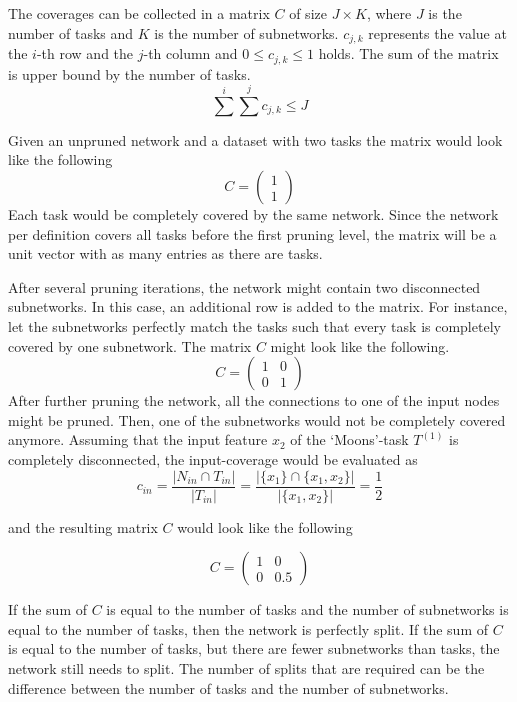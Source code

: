 The coverages can be collected in a matrix $C$ of size $J \times K$, where $J$ is the number of tasks and $K$ is the number of subnetworks. 
$c_{j,k}$ represents the value at the $i$-th row and the $j$-th column and $0 \leq c_{j,k} \leq 1$ holds.
The sum of the matrix is upper bound by the number of tasks.
\[
\sum^{i} \sum^{j} c_{j,k} \leq J
\]

Given an unpruned network and a dataset with two tasks the matrix would look like the following 
\[
C = \begin{pmatrix}
    1 \\ 1
\end{pmatrix}
\]
Each task would be completely covered by the same network.
Since the network per definition covers all tasks before the first pruning level, the matrix will be a unit vector with as many entries as there are tasks.

After several pruning iterations, the network might contain two disconnected subnetworks.
In this case, an additional row is added to the matrix.
For instance, let the subnetworks perfectly match the tasks such that every task is completely covered by one subnetwork.
The matrix $C$ might look like the following.
\[
C = \begin{pmatrix}
    1 & 0 \\ 0 & 1
\end{pmatrix}
\]
After further pruning the network, all the connections to one of the input nodes might be pruned.
Then, one of the subnetworks would not be completely covered anymore.
Assuming that the input feature $x_2$ of the `Moons'-task $T^{(1)}$ is completely disconnected, the input-coverage would be evaluated as 
\[
    c_{in} = \frac{|N_{in}  \cap T_{in} |}{|T_{in} |} = \frac{|\{x_1\} \cap \{x_1, x_2\}|}{|\{x_1, x_2\}|} = \frac{1}{2}
\]

and the resulting matrix $C$ would look like the following

\[
C = \begin{pmatrix}
    1 & 0 \\ 0 & 0.5
\end{pmatrix}
\]

If the sum of $C$ is equal to the number of tasks and the number of subnetworks is equal to the number of tasks, then the network is perfectly split.
If the sum of $C$ is equal to the number of tasks, but there are fewer subnetworks than tasks, the network still needs to split.
The number of splits that are required can be the difference between the number of tasks and the number of subnetworks.

